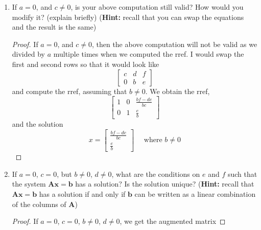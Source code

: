 \documentclass[11pt]{scrartcl}
\begin{document}
\begin{enumerate}[label=\alph*.]
{\begin{proof}
		      \[x =
			      \begin{bmatrix}
				      \frac{de-bf}{ad-cb} \\
				      \frac{af-ce}{ad-cb}
			      \end{bmatrix} =
			      \frac{1}{ad-cb}
			      \begin{bmatrix}
				      de-bf \\
				      af-ce
			      \end{bmatrix}
			      \text{ where } ad-cb \neq 0
		      \]
	      \end{proof}
	      }
	\item{
	      If $a = 0$, and $c\neq 0$, is your above computation still valid?
	      How would you modify it? (explain briefly)
	      (\textbf{Hint:} recall that you can swap the equations and the result is the same)
	      \begin{proof}
		      If $a = 0$, and $c\neq 0$, then the above computation will not be valid as we
		      divided by $a$ multiple times when we computed the rref. I would swap the first
		      and second rows so that it would look like
		      \[
			      \left[\begin{array}{cc|c}
					      c & d & f \\
					      0 & b & e
				      \end{array}\right]
		      \]
		      and compute the rref, assuming that $b\neq0$. We obtain the rref,
		      \[
			      \left[\begin{array}{cc|c}
					      1 & 0 & \frac{bf-de}{bc} \\
					      0 & 1 & \frac{e}{b}
				      \end{array}\right]
		      \]
		      and the solution
		      \[
			      x=
			      \begin{bmatrix}
				      \frac{bf-de}{bc} \\
				      \frac{e}{b}
			      \end{bmatrix} \quad \text{ where } b \neq 0
		      \]
	      \end{proof}
	      }
	\item{
	      If $a = 0$, $c=0$, but $b \neq 0$, $d \neq 0$,
	      what are the conditions on $e$ and $f$ such that the system $\mathbf{Ax=b}$ has a solution?
	      Is the solution unique?  (\textbf{Hint:} recall that $\mathbf{Ax = b}$ has a solution if and only if
	      $\mathbf{b}$ can be written as a linear combination of the columns of $\mathbf{A}$)
	      \begin{proof}
		      If $a = 0$, $c=0$, $b \neq 0$, $d \neq 0$, we get the augmented matrix

\end{proof}}
\end{enumerate}
\end{document}
